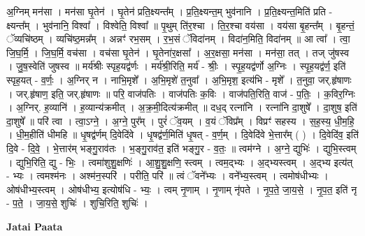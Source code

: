 \documentclass[17pt]{extarticle}
\begin{document}
अ॒ग्निम् मन॑सा । मन॑सा घृ॒तेन॑ । घृ॒तेन॑ प्रति॒क्ष्यन्त᳚म् । प्र॒ति॒क्ष्यन्त॒म् भुव॑नानि । प्र॒ति॒क्ष्यन्त॒मिति॑ प्रति - क्ष्यन्त᳚म् । भुव॑नानि॒ विश्वा᳚ । विश्वेति॒ विश्वा᳚ ॥ पृ॒थुम् ति॑र॒श्चा । ति॒र॒श्चा वय॑सा । वय॑सा बृ॒हन्त᳚म् । बृ॒हन्तं॒ ॅव्यचि॑ष्ठम् । व्यचि॑ष्ठ॒मन्न᳚म् । अन्नꣳ॑ रभ॒सम् । र॒भ॒सं ॅविदा॑नम् । विदा॑न॒मिति॒ विदा॑नम् ॥ आ त्वा᳚ । त्वा॒ जि॒घ॒र्मि॒ । जि॒घ॒र्मि॒ वच॑सा । वच॑सा घृ॒तेन॑ । घृ॒तेना॑र॒क्षसा᳚ । अ॒र॒क्षसा॒ मन॑सा । मन॑सा॒ तत् । तज् जु॑षस्व । जु॒ष॒स्वेति॑ जुषस्व ॥ मर्य॑श्रीः स्पृह॒यद्व॑र्णः । मर्य॑श्री॒रिति॒ मर्य॑ - श्रीः॒ । स्पृ॒ह॒यद्व॑र्णो अ॒ग्निः । स्पृ॒ह॒यद्व॑र्ण॒ इति॑ स्पृह॒यत् - व॒र्णः॒ । अ॒ग्निर् न । नाभि॒मृशे᳚ । अ॒भि॒मृशे॑ त॒नुवा᳚ । अ॒भि॒मृश॒ इत्य॑भि - मृशे᳚ । त॒नुवा॒ जर्.हृ॑षाणः । जर्.हृ॑षाण॒ इति॒ जर्.हृ॑षाणः ॥ परि॒ वाज॑पतिः । वाज॑पतिः क॒विः । वाज॑पति॒रिति॒ वाज॑ - प॒तिः॒ । क॒विर॒ग्निः । अ॒ग्निर्. ह॒व्यानि॑ । ह॒व्यान्य॑क्रमीत् । अ॒क्र॒मी॒दित्य॑क्रमीत् ॥ दध॒द् रत्ना॑नि । रत्ना॑नि दा॒शुषे᳚ । दा॒शुष॒ इति॑ दा॒शुषे᳚ ॥ परि॑ त्वा । त्वा॒ऽग्ने॒ । अ॒ग्ने॒ पुर᳚म् । पुरं॑ ॅव॒यम् । व॒यं ॅविप्र᳚म् । विप्रꣳ॑ सहस्य । स॒ह॒स्य॒ धी॒म॒हि॒ । धी॒म॒हीति॑ धीमहि ॥ धृ॒षद्व॑र्णम् दि॒वेदि॑वे । धृ॒षद्व॑र्ण॒मिति॑ धृ॒षत् - व॒र्ण॒म् । दि॒वेदि॑वे भे॒त्तार᳚म् ( ) । दि॒वेदि॑व॒ इति॑ दि॒वे - दि॒वे॒ । भे॒त्तार॑म् भङ्गु॒राव॑तः । भ॒ङ्गु॒राव॑त॒ इति॑ भङ्गु॒र - व॒तः॒ ॥ त्वम॑ग्ने । अ॒ग्ने॒ द्युभिः॑ । द्युभि॒स्त्वम् । द्युभि॒रिति॒ द्यु - भिः॒ । त्वमा॑शुशु॒क्षणिः॑ । आ॒शु॒शु॒क्षणि॒ स्त्वम् । त्वम॒द्भ्यः । अ॒द्भ्यस्त्वम् । अ॒द्भ्य इत्य॑त् - भ्यः । त्वमश्म॑नः । अश्म॑न॒स्परि॑ । परीति॒ परि॑ ॥ त्वं ॅवने᳚भ्यः । वने᳚भ्य॒स्त्वम् । त्वमोष॑धीभ्यः । ओष॑धीभ्य॒स्त्वम् । ओष॑धीभ्य॒ इत्योष॑धि - भ्यः॒ । त्वम् नृ॒णाम् । नृ॒णाम् नृ॑पते । नृ॒प॒ते॒ जा॒य॒से॒ । नृ॒प॒त॒ इति॑ नृ - प॒ते॒ । जा॒य॒से॒ शुचिः॑ । शुचि॒रिति॒ शुचिः॑ । \newline

\textbf{Jatai Paata} \newline
\end{document}
